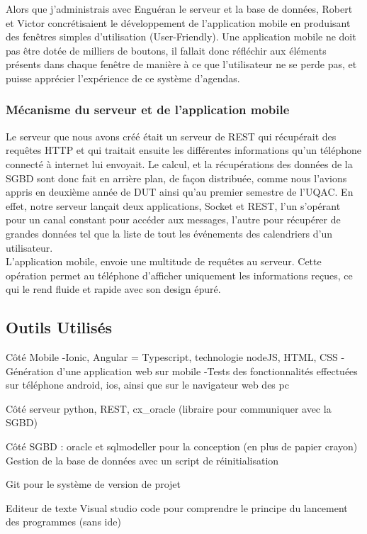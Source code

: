 Alors que j'administrais avec Enguéran le serveur et la base de données, Robert et Victor concrétisaient le développement de l'application mobile en produisant des fenêtres simples d'utilisation (User-Friendly). Une application mobile ne doit pas être dotée de milliers de boutons, il fallait donc réfléchir aux éléments présents dans chaque fenêtre de manière à ce que l'utilisateur ne se perde pas, et puisse apprécier l'expérience de ce système d'agendas.

\subsubsection{Mécanisme du serveur et de l'application mobile}

Le serveur que nous avons créé était un serveur de REST qui récupérait des requêtes HTTP et qui traitait ensuite les différentes informations qu'un téléphone connecté à internet lui envoyait. Le calcul, et la récupérations des données de la SGBD sont donc fait en arrière plan, de façon distribuée, comme nous l'avions appris en deuxième année de DUT ainsi qu'au premier semestre de l'UQAC. En effet, notre serveur lançait deux applications, Socket et REST, l'un s'opérant pour un canal constant pour accéder aux messages, l'autre pour récupérer de grandes données tel que la liste de tout les événements des calendriers d'un utilisateur.\\

L'application mobile, envoie une multitude de requêtes au serveur. Cette opération permet au téléphone d'afficher uniquement les informations reçues, ce qui le rend fluide et rapide avec son design épuré.


\subsection{Outils Utilisés}
Côté Mobile
-Ionic, Angular = Typescript, technologie nodeJS, HTML, CSS
-Génération d'une application web sur mobile
-Tests des fonctionnalités effectuées sur téléphone android, ios, ainsi que sur le navigateur web des pc

Côté serveur
python, REST, cx\_oracle (libraire pour communiquer avec la SGBD)

Côté SGBD : oracle et sqlmodeller pour la conception (en plus de papier crayon)
Gestion de la base de données avec un script de réinitialisation

Git pour le système de version de projet

Editeur de texte Visual studio code pour comprendre le principe du lancement des programmes (sans ide)


